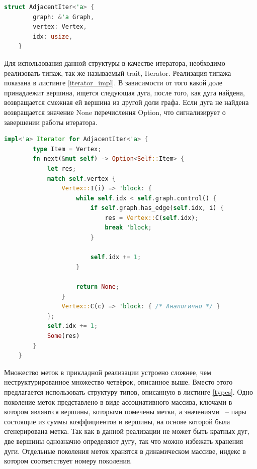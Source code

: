 \documentclass[14pt]{mmcs-article}
\begin{document}
\begin{lstlisting}[language=Rust, caption={ Структура, описывающая итератор по смежным вершинам. }, label=iterator_struct]
    struct AdjacentIter<'a> {
        graph: &'a Graph,
        vertex: Vertex,
        idx: usize,
    }
\end{lstlisting}

Для использования данной структуры в качестве итератора, необходимо реализовать типаж, так же называемый trait, Iterator. Реализация типажа показана в листинге \ref{iterator_impl}. В зависимости от того какой доле принадлежит вершина, ищется следующая дуга, после того, как дуга найдена, возвращается смежная ей вершина из другой доли графа. Если дуга не найдена возвращается значение None перечисления Option, что сигнализирует о завершении работы итератора. 

\begin{lstlisting}[language=Rust, caption={ Реализация типажа Iterator для структуры итератора по смежным вершинам. }, label=iterator_impl]
    impl<'a> Iterator for AdjacentIter<'a> {
        type Item = Vertex;
        fn next(&mut self) -> Option<Self::Item> {
            let res;
            match self.vertex {
                Vertex::I(i) => 'block: {
                    while self.idx < self.graph.control() {
                        if self.graph.has_edge(self.idx, i) {
                            res = Vertex::C(self.idx);
                            break 'block;
                        }

                        self.idx += 1;
                    }

                    return None;
                }
                Vertex::C(c) => 'block: { /* Аналогично */ }
            };
            self.idx += 1;
            Some(res)
        }
    }
\end{lstlisting}

Множество меток в прикладной реализации устроено сложнее, чем неструктурированное множество четвёрок, описанное выше. Вместо этого предлагается использовать структуру типов, описанную в листинге \ref{types}. Одно поколение меток представлено в виде ассоциативного массива, ключами в котором являются вершины, которыми помечены метки, а значениями ~-- пары состоящие из суммы коэффициентов и вершины, на основе которой была сгенерирована метка. Так как в данной реализации не может быть кратных дуг, две вершины однозначно определяют дугу, так что можно избежать хранения дуги. Отдельные поколения меток хранятся в динамическом массиве, индекс в котором соответствует номеру поколения.
\end{document}

